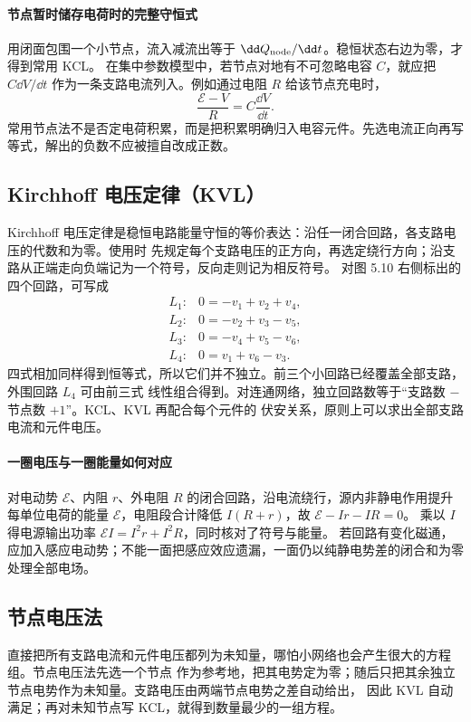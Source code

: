\paragraph{节点暂时储存电荷时的完整守恒式}
用闭面包围一个小节点，流入减流出等于 $\dd Q_{\rm node}/\dd t$。稳恒状态右边为零，才得到常用 KCL。
在集中参数模型中，若节点对地有不可忽略电容 $C$，就应把 $C\dd V/\dd t$ 作为一条支路电流列入。例如通过电阻 $R$ 给该节点充电时，
\[
 \frac{\mathcal E-V}{R}=C\frac{\dd V}{\dd t}.
\]
常用节点法不是否定电荷积累，而是把积累明确归入电容元件。先选电流正向再写等式，解出的负数不应被擅自改成正数。

\subsection*{Kirchhoff 电压定律（KVL）}

Kirchhoff 电压定律是稳恒电路能量守恒的等价表达：沿任一闭合回路，各支路电压的代数和为零。使用时
先规定每个支路电压的正方向，再选定绕行方向；沿支路从正端走向负端记为一个符号，反向走则记为相反符号。
对图 5.10 右侧标出的四个回路，可写成
\[
\begin{array}{ll}
L_1:&0=-v_1+v_2+v_4,\\
L_2:&0=-v_2+v_3-v_5,\\
L_3:&0=-v_4+v_5-v_6,\\
L_4:&0=v_1+v_6-v_3.
\end{array}
\]
四式相加同样得到恒等式，所以它们并不独立。前三个小回路已经覆盖全部支路，外围回路 $L_4$ 可由前三式
线性组合得到。对连通网络，独立回路数等于“支路数 $-$ 节点数 $+1$”。KCL、KVL 再配合每个元件的
伏安关系，原则上可以求出全部支路电流和元件电压。


\paragraph{一圈电压与一圈能量如何对应}
对电动势 $\mathcal E$、内阻 $r$、外电阻 $R$ 的闭合回路，沿电流绕行，源内非静电作用提升每单位电荷的能量 $\mathcal E$，电阻段合计降低 $I(R+r)$，故
$\mathcal E-Ir-IR=0$。
乘以 $I$ 得电源输出功率 $\mathcal EI=I^2r+I^2R$，同时核对了符号与能量。
若回路有变化磁通，应加入感应电动势；不能一面把感应效应遗漏，一面仍以纯静电势差的闭合和为零处理全部电场。

\subsection*{节点电压法}

直接把所有支路电流和元件电压都列为未知量，哪怕小网络也会产生很大的方程组。节点电压法先选一个节点
作为参考地，把其电势定为零；随后只把其余独立节点电势作为未知量。支路电压由两端节点电势之差自动给出，
因此 KVL 自动满足；再对未知节点写 KCL，就得到数量最少的一组方程。

